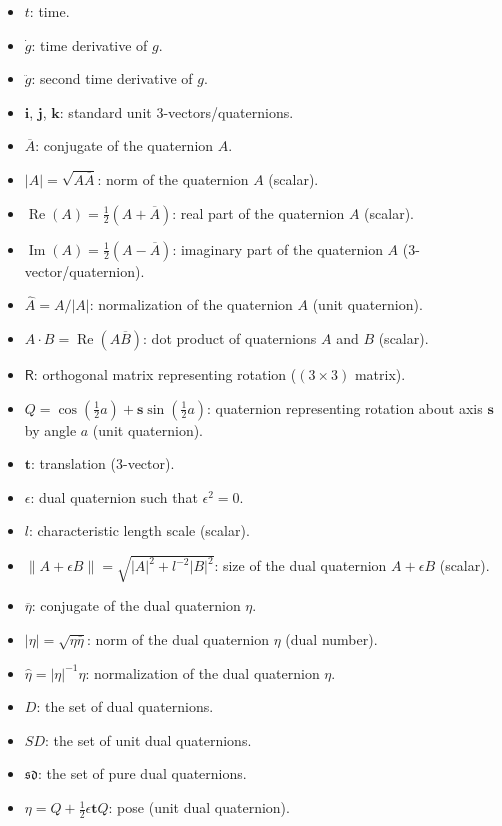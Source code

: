 \documentclass[reqno,12pt]{amsart}
\newcommand\bi{\bm i}
\newcommand\bj{\bm j}
\newcommand\bk{\bm k}
\newcommand\setdualquat{D}
\newcommand\setunitdualquat{SD}
\newcommand\setpuredualquat{\mathfrak{sd}}
\DeclareMathOperator\realpart{Re}
\DeclareMathOperator\imagpart{Im}
\begin{document}
\begin{itemize}
\item $t$: time.
\item $\dot g$: time derivative of $g$.
\item $\ddot g$: second time derivative of $g$.
\item $\bi$, $\bj$, $\bk$: standard unit 3-vectors/quaternions.
\item $\overline A$: conjugate of the quaternion $A$.
\item $|A| = \sqrt{A\overline A}$: norm of the quaternion $A$ (scalar).
\item $\realpart(A) = \tfrac12(A + \overline A)$: real part of the quaternion $A$ (scalar).
\item $\imagpart(A) = \tfrac12(A - \overline A)$: imaginary part of the quaternion $A$ (3-vector/quaternion).
\item $\widehat{A} = A/|A|$: normalization of the quaternion $A$ (unit quaternion).
\item $A \cdot B = \realpart(A \overline B)$: dot product of quaternions $A$ and $B$ (scalar).
\item $\mathsf R$: orthogonal matrix representing rotation ($(3 \times 3)$ matrix).
\item $Q = \cos(\tfrac12 a) + \bm s \sin(\tfrac12 a)$: quaternion representing rotation about axis $\bm s$ by angle $a$ (unit quaternion).
\item $\bm t$: translation (3-vector).
\item $\epsilon$: dual quaternion such that $\epsilon^2 = 0$.
\item $l$: characteristic length scale (scalar).
\item $\|A + \epsilon B\| = \sqrt{|A|^2 + l^{-2} |B|^2}$: size of the dual quaternion $A + \epsilon B$ (scalar).
\item $\overline\eta$: conjugate of the dual quaternion $\eta$.
\item $|\eta| = \sqrt{\eta\overline\eta}$: norm of the dual quaternion $\eta$ (dual number).
\item $\widehat\eta = |\eta|^{-1} \eta$: normalization of the dual quaternion $\eta$.
\item $\setdualquat$: the set of dual quaternions.
\item $\setunitdualquat$: the set of unit dual quaternions.
\item $\setpuredualquat$: the set of pure dual quaternions.
\item $\eta = Q + \frac12 \epsilon \bm t Q$: pose (unit dual quaternion).

\end{itemize}
\end{document}
